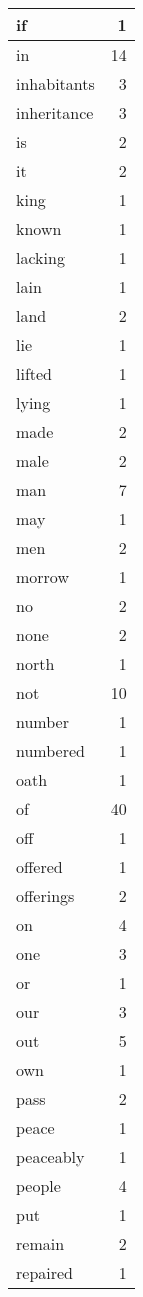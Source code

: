 \begin{center}
\begin{longtable}{l|r}
if & 1 \\ \hline
in & 14 \\ \hline
inhabitants & 3 \\ \hline
inheritance & 3 \\ \hline
is & 2 \\ \hline
it & 2 \\ \hline
king & 1 \\ \hline
known & 1 \\ \hline
lacking & 1 \\ \hline
lain & 1 \\ \hline
land & 2 \\ \hline
lie & 1 \\ \hline
lifted & 1 \\ \hline
lying & 1 \\ \hline
made & 2 \\ \hline
male & 2 \\ \hline
man & 7 \\ \hline
may & 1 \\ \hline
men & 2 \\ \hline
morrow & 1 \\ \hline
no & 2 \\ \hline
none & 2 \\ \hline
north & 1 \\ \hline
not & 10 \\ \hline
number & 1 \\ \hline
numbered & 1 \\ \hline
oath & 1 \\ \hline
of & 40 \\ \hline
off & 1 \\ \hline
offered & 1 \\ \hline
offerings & 2 \\ \hline
on & 4 \\ \hline
one & 3 \\ \hline
or & 1 \\ \hline
our & 3 \\ \hline
out & 5 \\ \hline
own & 1 \\ \hline
pass & 2 \\ \hline
peace & 1 \\ \hline
peaceably & 1 \\ \hline
people & 4 \\ \hline
put & 1 \\ \hline
remain & 2 \\ \hline
repaired & 1 \\ \hline

\end{longtable}
\end{center}
